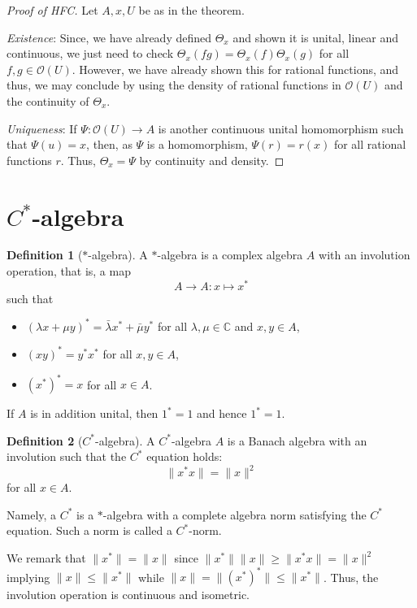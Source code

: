 \documentclass[]{article}
\theoremstyle{definition}
\newtheorem{definition}{Definition}[section]
\begin{document}
\begin{proof}[Proof of HFC]
  Let \(A, x, U\) be as in the theorem. 

  \textit{Existence}: Since, we have already defined \(\Theta_x\) and shown it is unital, linear and continuous,
  we just need to check \(\Theta_x(fg) = \Theta_x(f)\Theta_x(g)\) for all \(f, g \in \mathcal{O}(U)\).
  However, we have already shown this for rational functions, and thus, we may conclude by using the density 
  of rational functions in \(\mathcal{O}(U)\) and the continuity of \(\Theta_x\). 

  \textit{Uniqueness}: If \(\Psi : \mathcal{O}(U) \to A\) is another continuous unital homomorphism such that 
  \(\Psi(u) = x\), then, as \(\Psi\) is a homomorphism, \(\Psi(r) = r(x)\) for all rational functions \(r\). 
  Thus, \(\Theta_x = \Psi\) by continuity and density.
\end{proof}

\newpage
\section{\texorpdfstring{\(C^*\)-algebra}{C*-algebra}}

\begin{definition}[\(*\)-algebra]
  A \(*\)-algebra is a complex algebra \(A\) with an involution operation, that is, a map 
  \[A \to A : x \mapsto x^*\]
  such that 
  \begin{itemize}
    \item \((\lambda x + \mu y)^* = \bar \lambda x^* + \bar \mu y^*\) for all \(\lambda, \mu \in \mathbb{C}\) and
      \(x, y \in A\),
    \item \((xy)^* = y^* x^*\) for all \(x, y \in A\),
    \item \((x^*)^* = x\) for all \(x \in A\).
  \end{itemize}
  If \(A\) is in addition unital, then \(1^* = 1\) and hence \(1^* = 1\).
\end{definition}

\begin{definition}[\(C^*\)-algebra]
  A \(C^*\)-algebra \(A\) is a Banach algebra with an involution such that the \(C^*\) equation holds: 
  \[\|x^*x\| = \|x\|^2\]
  for all \(x \in A\).

  Namely, a \(C^*\) is a \(*\)-algebra with a complete algebra norm satisfying the \(C^*\) equation. 
  Such a norm is called a \(C^*\)-norm.
\end{definition}

We remark that \(\|x^*\| = \|x\|\) since \(\|x^*\| \|x\| \ge \|x^*x\| = \|x\|^2\) implying 
\(\|x\| \le \|x^*\|\) while \(\|x\| = \|(x^*)^*\| \le \|x^*\|\). Thus, the involution operation is 
continuous and isometric.
\end{document}
